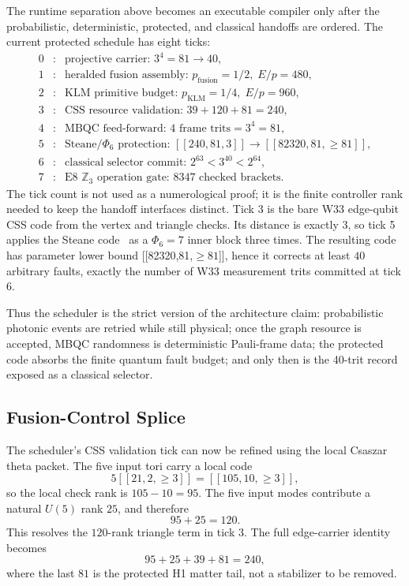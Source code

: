 ﻿\documentclass[12pt]{article}
\begin{document}
The runtime separation above becomes an executable compiler only after the
probabilistic, deterministic, protected, and classical handoffs are ordered.  The
current protected schedule has eight ticks:
\[
\begin{array}{ccl}
0&:&\text{projective carrier: }3^4=81\to 40,\\
1&:&\text{heralded fusion assembly: }p_{\mathrm{fusion}}=1/2,\;E/p=480,\\
2&:&\text{KLM primitive budget: }p_{\mathrm{KLM}}=1/4,\;E/p=960,\\
3&:&\text{CSS resource validation: }39+120+81=240,\\
4&:&\text{MBQC feed-forward: }4\text{ frame trits}=3^4=81,\\
5&:&\text{Steane}/\Phi_6\text{ protection: }[[240,81,3]]\to[[82320,81,\ge81]],\\
6&:&\text{classical selector commit: }2^{63}<3^{40}<2^{64},\\
7&:&\text{E8 } \mathbb{Z}_3\text{ operation gate: }8347\text{ checked brackets.}
\end{array}
\]
The tick count is not used as a numerological proof; it is the finite controller
rank needed to keep the handoff interfaces distinct.  Tick 3 is the bare W33
edge-qubit CSS code from the vertex and triangle checks.  Its distance is exactly
3, so tick 5 applies the Steane code~\cite{Steane1996} as a $\Phi_6=7$ inner block
three times.  The resulting code has parameter lower bound
[[82320,81,\(\ge 81\)]], hence it corrects at least \(40\) arbitrary faults, exactly
the number of W33 measurement trits committed at tick 6.

Thus the scheduler is the strict version of the architecture claim: probabilistic
photonic events are retried while still physical; once the graph resource is
accepted, MBQC randomness is deterministic Pauli-frame data; the protected code
absorbs the finite quantum fault budget; and only then is the 40-trit record exposed
as a classical selector.

\subsection{Fusion-Control Splice}

The scheduler's CSS validation tick can now be refined using the local
Csaszar theta packet.  The five input tori carry a local code
\[
5[[21,2,\ge 3]]=[[105,10,\ge 3]],
\]
so the local check rank is \(105-10=95\).  The five input modes contribute a
natural \(U(5)\) rank \(25\), and therefore
\[
95+25=120.
\]
This resolves the \(120\)-rank triangle term in tick 3.  The full edge-carrier
identity becomes
\[
95+25+39+81=240,
\]
where the last \(81\) is the protected H1 matter tail, not a stabilizer to be
removed.
\end{document}
